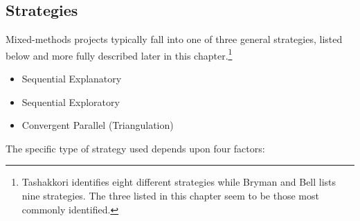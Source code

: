 
\subsection{Strategies}

Mixed-methods projects typically fall into one of three general strategies, listed below and more fully described later in this chapter.\footnote{Tashakkori\cite{tashakkori1998mixed} identifies eight different strategies while Bryman and Bell\cite{bell2015business} lists nine strategies. The three listed in this chapter seem to be those most commonly identified.}

\begin{itemize}

	\item Sequential Explanatory

	\item Sequential Exploratory

	\item Convergent Parallel (Triangulation)

\end{itemize}

The specific type of strategy used depends upon four factors:

